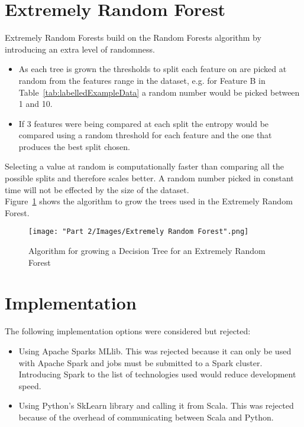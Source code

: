 	\section{Extremely Random Forest}
	Extremely Random Forests\cite{geurts2006extremely} build on the Random Forests algorithm by introducing an extra level of randomness. 
	\begin{itemize}
		\item As each tree is grown the thresholds to split each feature on are picked at random from the features range in the dataset, e.g. for Feature B in Table~\ref{tab:labelledExampleData} a random number would be picked between 1 and 10. 
		\item If 3 features were being compared at each split the entropy would be compared using a random threshold for each feature and the one that produces the best split chosen.
	\end{itemize}		
			
	Selecting a value at random is computationally faster than comparing all the possible splits and therefore scales better. A random number picked in constant time will not be effected by the size of the dataset.\\
		
	Figure~\ref{fig:extremelyRandomForestTree} shows the algorithm to grow the trees used in the Extremely Random Forest.
	
		\begin{figure}[H]
			\centering
			\texttt{[image: "Part 2/Images/Extremely Random Forest".png]}
			\caption{Algorithm for growing a Decision Tree for an Extremely Random Forest\cite{geurts2006extremely}}
    			\label{fig:extremelyRandomForestTree}
		\end{figure}		
		
	\section{Implementation}
	The following implementation options were considered but rejected:
	\begin{itemize}
		\item Using Apache Sparks MLlib\cite{spark}. This was rejected because it can only be used with Apache Spark and jobs must be submitted to a Spark cluster. Introducing Spark to the list of technologies used would reduce development speed.
		\item Using Python's SkLearn library\cite{Sklearn} and calling it from Scala. This was rejected because of the overhead of communicating between Scala and Python\cite{CallingPythonFromScala}.
	\end{itemize}		
			
